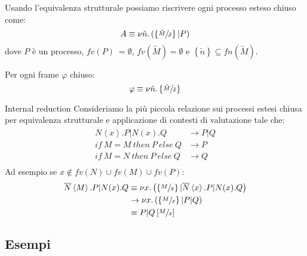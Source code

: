 \documentclass{beamer}
\theoremstyle{plain}
\theoremstyle{definition}
\theoremstyle{remark}
\newcommand{\obar}[1]{\overline{#1}}
\newcommand{\set}[1]{\left\{#1\right\}}
\newcommand{\pa}[1]{\left(#1\right)}
\newcommand{\ang}[1]{\left<#1\right>}
\newcommand{\bra}[1]{\left[#1\right]}
\begin{document}
\begin{frame}
  Usando l'equivalenza strutturale possiamo riscrivere ogni processo
  esteso chiuso come:
  \[ A \equiv \nu \tilde n. \pa{ \set{\sfrac{\tilde M}{\tilde x}} | P
    } \]
  dove $P$ \`e un processo, $fv(P)\ = \emptyset$, $fv(\tilde M) =
  \emptyset$ e $\set{\tilde n} \subseteq fn(\tilde M)$.
  \vfill

  Per ogni frame $\varphi$ chiuso:
  \[ \varphi \equiv \nu \tilde n. \set{\sfrac{\tilde M}{\tilde x}} \]
\end{frame}

\begin{frame}{Internal reduction}
  Consideriamo la pi\`u piccola relazione sui processi estesi chiusa
  per equivalenza strutturale e applicazione di contesti di
  valutazione tale che:
  \begin{align*}
    \obar{N}\ang{x}.P|N(x).Q & \rightarrow P|Q \\
    if\ M=M\ then\ P\ else\ Q & \rightarrow P \\
    if\ M=N\ then\ P\ else\ Q & \rightarrow Q \\
  \end{align*}
  \vfill
  \pause 
  Ad esempio se $x \not\in fv(N)\cup fv(M)\cup fv(P)$:
  \begin{align*}
    \obar{N}\ang{M}.P | N(x).Q & \equiv \nu x.\pa{ \set{\sfrac{M}{x}}
                                 | \obar{N} \ang{x}.P | N(x).Q } \\
    & \rightarrow \nu x.\pa{\set{\sfrac{M}{x}}|P|Q} \\
    & \equiv P|Q\bra{\sfrac{M}{x}}
  \end{align*}
\end{frame}

\subsection{Esempi}
\end{document}
